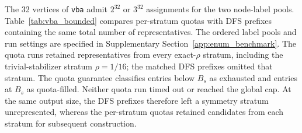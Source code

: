 \documentclass[a5paper, 10pt]{article}
\begin{document}
The 32 vertices of \texttt{vba} admit $2^{32}$ or $3^{32}$ assignments for the two node-label pools. Table~\ref{tab:vba_bounded} compares per-stratum quotas with DFS prefixes containing the same total number of representatives. The ordered label pools and run settings are specified in Supplementary Section~\ref{app:enum_benchmark}. The quota runs retained representatives from every exact-$\rho$ stratum, including the trivial-stabilizer stratum $\rho=1/16$; the matched DFS prefixes omitted that stratum. The quota guarantee classifies entries below $B_s$ as exhausted and entries at $B_s$ as quota-filled. Neither quota run timed out or reached the global cap. At the same output size, the DFS prefixes therefore left a symmetry stratum unrepresented, whereas the per-stratum quotas retained candidates from each stratum for subsequent construction.
\end{document}
